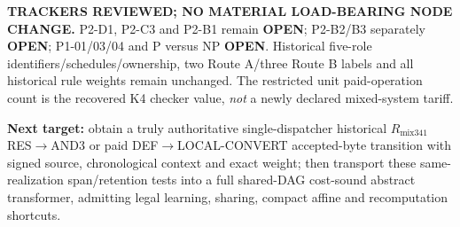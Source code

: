 \documentclass[11pt]{article}
\begin{document}
\textbf{TRACKERS REVIEWED; NO MATERIAL LOAD-BEARING NODE CHANGE.} P2-D1, P2-C3 and P2-B1 remain \textbf{OPEN}; P2-B2/B3 separately \textbf{OPEN}; P1-01/03/04 and P versus NP \textbf{OPEN}. Historical five-role identifiers/schedules/ownership, two Route A/three Route B labels and all historical rule weights remain unchanged. The restricted unit paid-operation count is the recovered K4 checker value, \emph{not} a newly declared mixed-system tariff.

\noindent\textbf{Next target:} obtain a truly authoritative single-dispatcher historical $R_{\mathrm{mix341}}$ RES$\to$AND3 or paid DEF$\to$LOCAL-CONVERT accepted-byte transition with signed source, chronological context and exact weight; then transport these same-realization span/retention tests into a full shared-DAG cost-sound abstract transformer, admitting legal learning, sharing, compact affine and recomputation shortcuts.
\end{document}

